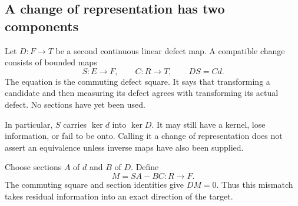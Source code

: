 \subsection{A change of representation has two components}
Let \(D:F\to T\) be a second continuous linear defect map. A compatible change consists of bounded maps
\[
 S:E\to F,\qquad C:R\to T,\qquad DS=Cd.
\]
The equation is the commuting defect square. It says that transforming a candidate and then measuring its defect agrees with transforming its actual defect. No sections have yet been used.

In particular, \(S\) carries \(\ker d\) into \(\ker D\). It may still have a kernel, lose information, or fail to be onto. Calling it a change of representation does not assert an equivalence unless inverse maps have also been supplied.

Choose sections \(A\) of \(d\) and \(B\) of \(D\). Define
\begin{equation}\label{eq:repair-mismatch}
 M=SA-BC:R\longrightarrow F.
\end{equation}
The commuting square and section identities give \(DM=0\). Thus this mismatch takes residual information into an exact direction of the target.

